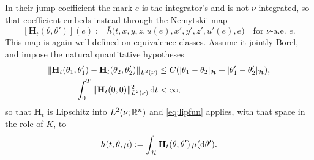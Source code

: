 \begin{example}
In their jump coefficient the mark $e$ is the integrator's and is not $\nu$-integrated, so
that coefficient embeds instead through the Nemytskii map
\[
[\mathbf H_t(\theta,\theta')](e):=\bar h\bigl(t,x,y,z,u(e),x',y',z',u'(e),e\bigr)
\quad\text{for $\nu$-a.e.\ }e .
\]
This map is again well defined on equivalence classes. Assume it jointly Borel, and impose the
natural quantitative hypotheses
\[
\begin{aligned}
\|\mathbf H_t(\theta_1,\theta_1')-\mathbf H_t(\theta_2,\theta_2')\|_{L^2(\nu)}
&\le C(|\theta_1-\theta_2|_{\mathcal H}+|\theta_1'-\theta_2'|_{\mathcal H}),\\
\int_0^T\|\mathbf H_t(0,0)\|_{L^2(\nu)}^2\,\mathrm{d} t&<\infty ,
\end{aligned}
\]
so that $\mathbf H_t$ is Lipschitz into $L^2(\nu;\mathbb{R}^n)$ and \eqref{eq:lipfun} applies,
with that space in the role of $K$, to
\[
h(t,\theta,\mu):=\int_{\mathcal H}\mathbf H_t(\theta,\theta')\,\mu(\mathrm{d}\theta') .
\]
\end{example}

